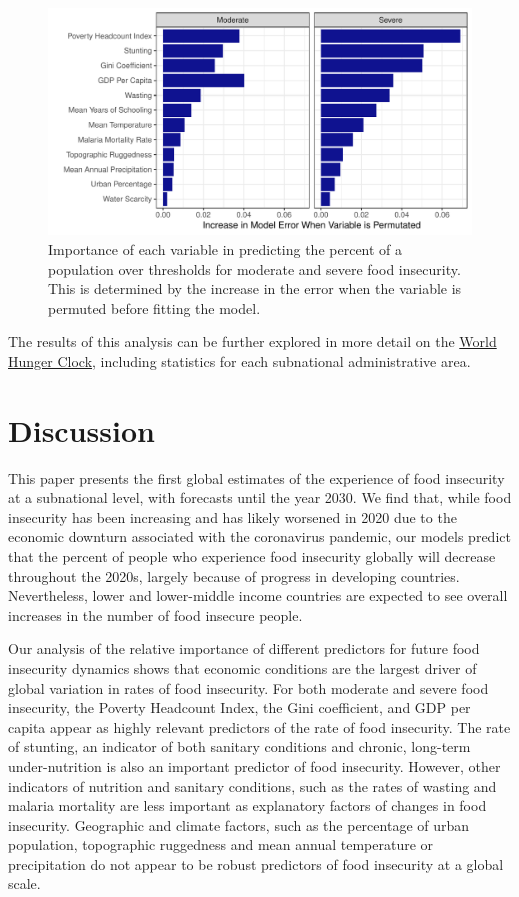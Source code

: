 \documentclass{article}
\begin{document}
\begin{figure}[h]
  \centering
  \includegraphics[width=\linewidth]{img/VIMP.pdf}
  \caption{Importance of each variable in predicting the percent of a population over thresholds for moderate and severe food insecurity.  This is determined by the increase in the error when the variable is permuted before fitting the model.}
  \label{fig:vimp}
\end{figure}

The results of this analysis can be further explored in more detail on the \href{https://worldhunger.io}{World Hunger Clock}, including statistics for each subnational administrative area.

\section{Discussion}
This paper presents the first global estimates of the experience of food insecurity at a subnational level, with forecasts until the year 2030.  We find that, while food insecurity has been increasing and has likely worsened in 2020 due to the economic downturn associated with the coronavirus pandemic, our models predict that the percent of people who experience food insecurity globally will decrease throughout the 2020s, largely because of progress in developing countries.  Nevertheless, lower and lower-middle income countries are expected to see overall increases in the number of food insecure people. 

Our analysis of the relative importance of different predictors for future food insecurity dynamics shows that economic conditions are the largest driver of global variation in rates of food insecurity. For both moderate and severe food insecurity, the Poverty Headcount Index, the Gini coefficient, and GDP per capita appear as highly relevant predictors of the rate of food insecurity. The rate of stunting, an indicator of both sanitary conditions and chronic, long-term under-nutrition is also an important predictor of food insecurity. However, other indicators of nutrition and sanitary conditions, such as the rates of wasting and malaria mortality are less important as explanatory factors of changes in food insecurity. Geographic and climate factors, such as the percentage of urban population, topographic ruggedness and mean annual temperature or precipitation do not appear to be robust predictors of food insecurity at a global scale. 
\end{document}
